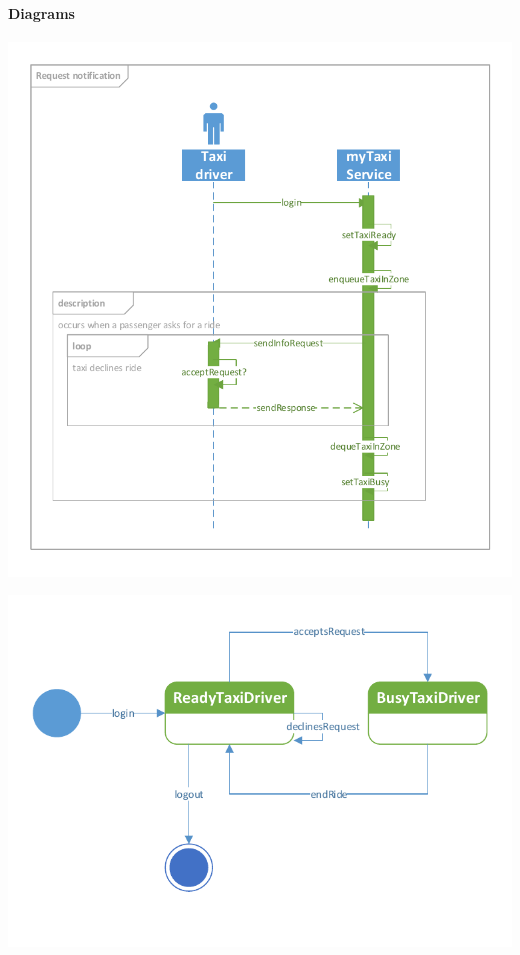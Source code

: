 	\paragraph{Diagrams}
	\begin{center}
	\includegraphics[width=\textwidth]{diagrams/notification}
\end{center}
\begin{center}
	\includegraphics[width=\textwidth]{diagrams/request_state}
\end{center}
	

